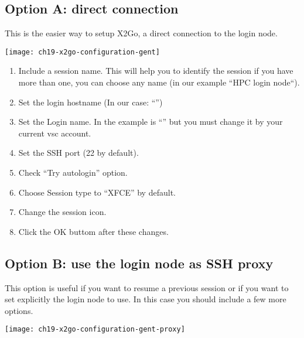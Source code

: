 \subsection{Option A: direct connection}
This is the easier way to setup X2Go, a direct connection to the login node.

\begin{center}
\texttt{[image: ch19-x2go-configuration-gent]}
\end{center}

\begin{enumerate}
    \item  Include a session name. This will help you to identify 
    the session if you have more than one, you can choose any name (in our example ``HPC login node``).
    \item  Set the login hostname (In our case: ``\strong{\emph{\loginnode}}'')
    \item  Set the Login name. In the example is ``'' but you must change it by your
    current vsc account.
    \item  Set the SSH port (22 by default).
    \item  Check ``Try autologin'' option.
    \item  Choose Session type to ``XFCE'' by default.
    \item  \strong{[optional]:} Change the session icon.
    \item  Click the OK buttom after these changes.
\end{enumerate}

\subsection{Option B: use the login node as SSH proxy}
This option is useful if you want to resume a previous session or if you want to set explicitly the login node to use.
In this case you should include a few more options.

\begin{center}
\texttt{[image: ch19-x2go-configuration-gent-proxy]}
\end{center}

